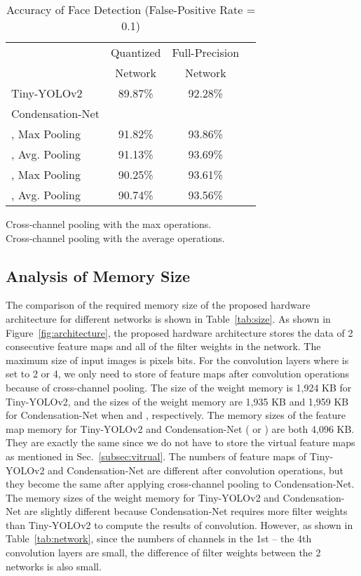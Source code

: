 \documentclass[10pt,twocolumn,letterpaper]{article}
\begin{document}
\begin{table}
\begin{center}
\begin{tabular}{l|ccc}
\hline
           & Quantized & Full-Precision \\
           & Network   & Network \\
\hline\hline
Tiny-YOLOv2                        &  89.87\% & 92.28\% \\
\hline
Condensation-Net\\
, Max Pooling    &  91.82\% & 93.86\% \\
, Avg. Pooling   &  91.13\% & 93.69\% \\
, Max Pooling    &  90.25\% & 93.61\% \\
, Avg. Pooling   &  90.74\% & 93.56\% \\
\hline
\end{tabular}
\end{center}
{\small
Cross-channel pooling with the max operations.\\
Cross-channel pooling with the average operations.\\
}
\caption{Accuracy of Face Detection (False-Positive Rate = 0.1)}
\label{tab:accuracy}
\end{table}

\subsection{Analysis of Memory Size}
\label{subsec:memory}

The comparison of the required memory size of the proposed hardware architecture for different networks is shown in Table~\ref{tab:size}. As shown in Figure~\ref{fig:architecture}, the proposed hardware architecture stores the data of 2 consecutive feature maps and all of the filter weights in the network. The maximum size of input images is  pixels  bits. For the convolution layers where  is set to 2 or 4, we only need to store  of feature maps after convolution operations because of cross-channel pooling. The size of the weight memory is 1,924 KB for Tiny-YOLOv2, and the sizes of the weight memory are 1,935 KB and 1,959 KB for Condensation-Net when  and , respectively. The memory sizes of the feature map memory for Tiny-YOLOv2 and Condensation-Net ( or ) are both 4,096 KB. They are exactly the same since we do not have to store the virtual feature maps as mentioned in Sec.~\ref{subsec:vitrual}. The numbers of feature maps of Tiny-YOLOv2 and Condensation-Net are different after convolution operations, but they become the same after applying cross-channel pooling to Condensation-Net. The memory sizes of the weight memory for Tiny-YOLOv2 and Condensation-Net are slightly different because Condensation-Net requires more filter weights than Tiny-YOLOv2 to compute the results of convolution. However, as shown in Table~\ref{tab:network}, since the numbers of channels in the 1st -- the 4th convolution layers are small, the difference of filter weights between the 2 networks is also small.
\end{document}
